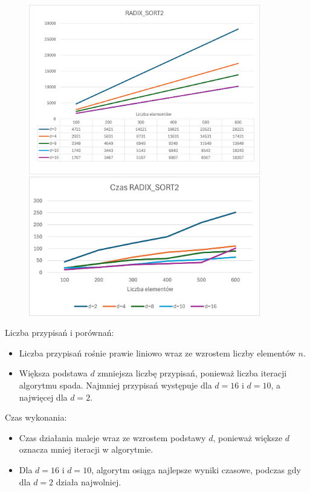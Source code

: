 \documentclass{article}
\begin{document}
			\begin{figure}[H]
				\centering
				\includegraphics[width=0.9\textwidth]{RS21.png}
				\includegraphics[width=0.9\textwidth]{RS22.png}
			\end{figure}
			
			Liczba przypisań i porównań:
			
			\begin{itemize}
				\item Liczba przypisań rośnie prawie liniowo wraz ze wzrostem liczby elementów \( n \).
				\item Większa podstawa \( d \) zmniejsza liczbę przypisań, ponieważ liczba iteracji algorytmu spada. Najmniej przypisań występuje dla \( d = 16 \) i \( d = 10 \), a najwięcej dla \( d = 2 \).
			\end{itemize}
			
			Czas wykonania:
			
			\begin{itemize}
				\item Czas działania maleje wraz ze wzrostem podstawy \( d \), ponieważ większe \( d \) oznacza mniej iteracji w algorytmie.
				\item Dla \( d = 16 \) i \( d = 10 \), algorytm osiąga najlepsze wyniki czasowe, podczas gdy dla \( d = 2 \) działa najwolniej.
			\end{itemize}
			
\end{document}
